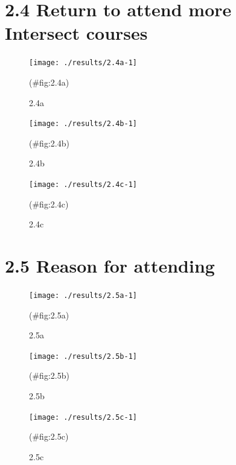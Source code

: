 \documentclass[
]{article}
\begin{document}
\hypertarget{return-to-attend-more-intersect-courses}{%
\section{2.4 Return to attend more Intersect courses}\label{return-to-attend-more-intersect-courses}}

\begin{figure}[H]

{\centering \texttt{[image: ./results/2.4a-1]} 

}

\caption{2.4a}(\#fig:2.4a)
\end{figure}

\begin{figure}[H]

{\centering \texttt{[image: ./results/2.4b-1]} 

}

\caption{2.4b}(\#fig:2.4b)
\end{figure}

\begin{figure}[H]

{\centering \texttt{[image: ./results/2.4c-1]} 

}

\caption{2.4c}(\#fig:2.4c)
\end{figure}

\hypertarget{reason-for-attending}{%
\section{2.5 Reason for attending}\label{reason-for-attending}}

\begin{figure}[H]

{\centering \texttt{[image: ./results/2.5a-1]} 

}

\caption{2.5a}(\#fig:2.5a)
\end{figure}

\begin{figure}[H]

{\centering \texttt{[image: ./results/2.5b-1]} 

}

\caption{2.5b}(\#fig:2.5b)
\end{figure}

\begin{figure}[H]

{\centering \texttt{[image: ./results/2.5c-1]} 

}

\caption{2.5c}(\#fig:2.5c)
\end{figure}
\end{document}
